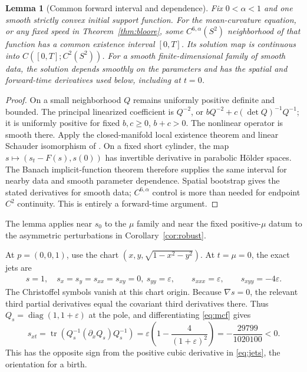 \documentclass[11pt,a4paper]{article}
\newtheorem{lemma}[theorem]{Lemma}
\theoremstyle{remark}\newtheorem{remark}[theorem]{Remark}
\DeclareMathOperator{\tr}{tr}\DeclareMathOperator{\sgn}{sgn}\DeclareMathOperator{\Cov}{Cov}
\begin{document}
\begin{lemma}[Common forward interval and dependence]\label{lem:dependence}
Fix $0<\alpha<1$ and one smooth strictly convex initial support function. For the mean-curvature equation, or any fixed speed in Theorem~\ref{thm:bloore}, some $C^{6,\alpha}(S^2)$ neighborhood of that function has a common existence interval $[0,T]$. Its solution map is continuous into $C([0,T];C^2(S^2))$. For a smooth finite-dimensional family of smooth data, the solution depends smoothly on the parameters and has the spatial and forward-time derivatives used below, including at $t=0$.
\end{lemma}
\begin{proof}
On a small neighborhood $Q$ remains uniformly positive definite and bounded. The principal linearized coefficient is $Q^{-2}$, or $bQ^{-2}+c(\det Q)^{-1}Q^{-1}$; it is uniformly positive for fixed $b,c\ge0$, $b+c>0$. The nonlinear operator is smooth there. Apply the closed-manifold local existence theorem and linear Schauder isomorphism of \citet[Theorems 1.1--1.2 and 2.3--2.4]{Huang}. On a fixed short cylinder, the map $s\mapsto(s_t-F(s),s(0))$ has invertible derivative in parabolic H\"older spaces. The Banach implicit-function theorem therefore supplies the same interval for nearby data and smooth parameter dependence. Spatial bootstrap gives the stated derivatives for smooth data; $C^{6,\alpha}$ control is more than needed for endpoint $C^2$ continuity. This is entirely a forward-time argument.
\end{proof}
The lemma applies near $s_0$ to the $\mu$ family and near the fixed positive-$\mu$ datum to the asymmetric perturbations in Corollary~\ref{cor:robust}.

At \(p=(0,0,1)\), use the chart \((x,y,\sqrt{1-x^2-y^2})\). At \(t=\mu=0\), the exact jets are
\begin{equation}\label{eq:jets}
 \begin{gathered}
 s=1,\quad s_x=s_y=s_{xx}=s_{xy}=0,\
 s_{yy}=\varepsilon,\qquad s_{xxx}=\varepsilon,
 \qquad s_{xyy}=-4\varepsilon.
 \end{gathered}
\end{equation}
The Christoffel symbols vanish at this chart origin. Because \(\nabla s=0\), the relevant third partial derivatives equal the covariant third derivatives there. Thus \(Q_s=\operatorname{diag}(1,1+\varepsilon)\) at the pole, and differentiating \eqref{eq:mcf} gives
\begin{equation}\label{eq:sxt}
 s_{xt}=\tr(Q_s^{-1}(\partial_xQ_s)Q_s^{-1})
 =\varepsilon\left(1-\frac4{(1+\varepsilon)^2}\right)
 =-\frac{29799}{1020100}<0.
\end{equation}
This has the opposite sign from the positive cubic derivative in \eqref{eq:jets}, the orientation for a birth.
\end{document}
